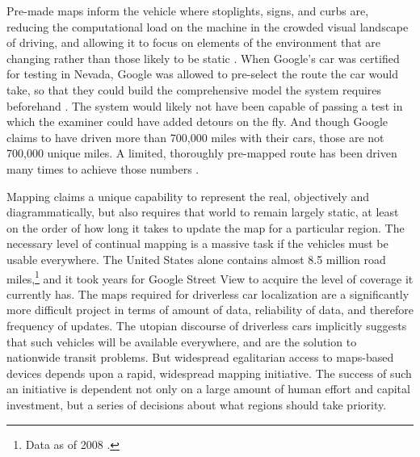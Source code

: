 
Pre-made maps inform the vehicle where stoplights, signs,
and curbs are, reducing the computational load on the machine in the
crowded visual landscape of driving, and allowing it to focus on
elements of the environment that are changing rather than those likely
to be static \cite{gomesObstacles}. When Google's car was certified for
testing in Nevada, Google was allowed to pre-select the route the car
would take, so that they could build the comprehensive model the
system requires beforehand \cite{harrisNevada}. The system would likely not have been
capable of passing a test in which the examiner could have added
detours on the fly. And though Google claims to have driven more than
700,000 miles with their cars, those are not 700,000 unique miles. A
limited, thoroughly pre-mapped route has been driven many times to
achieve those numbers \cite{gomesCircles}.

Mapping claims a unique capability to
represent the real, objectively
and diagrammatically, but also requires that world to remain largely
static, at least on the order of how long it takes to update the map
for a particular region. The necessary level of continual mapping is a massive task if the
vehicles must be usable everywhere. The United States alone contains almost
8.5 million road miles,\footnote{Data as of 2008 \cite{carneyMiles}.}
and it took years for Google Street View to acquire the level of
coverage it currently has. The maps required for driverless car
localization are a significantly more difficult project in terms of
amount of data, reliability of data, and therefore frequency of
updates. The utopian discourse of driverless cars
implicitly suggests that such vehicles will be available everywhere,
and are the solution to nationwide transit problems. But widespread
egalitarian access to maps-based devices depends upon a rapid,
widespread mapping initiative. The success of such an initiative is
dependent not only on a large amount of human effort and capital
investment, but a series of decisions about what regions should take priority.


